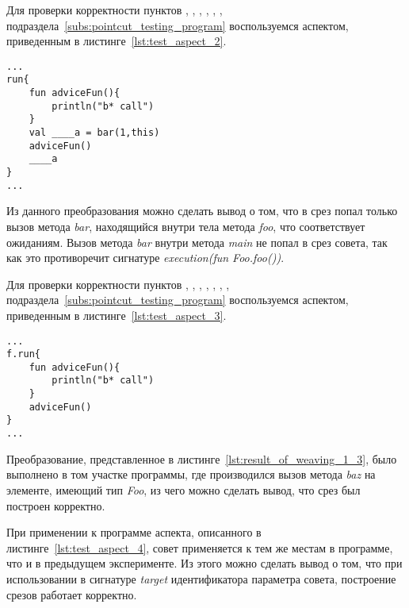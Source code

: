 Для проверки корректности пунктов
 \quotes{\ref{list:method_name_check}},
 \quotes{\ref{list:class_name_check}},
 \quotes{\ref{list:method_modifiers_check}},
 \quotes{\ref{list:method_return_value_check}},
 \quotes{\ref{list:execution_check}},
 \quotes{\ref{list:reference_pointcut_check}},
 \quotes{\ref{list:logic_operations_check}} подраздела~\ref{subs:pointcut_testing_program} воспользуемся аспектом, приведенным в листинге~\ref{lst:test_aspect_2}.
 \begin{lstlisting}[style={java}, label={lst:result_of_weaving_1_2},
 caption={Результат применения аспекта, описанного в листинге~\ref{lst:test_aspect_2}, к тестовой программе}]
...
run{
	fun adviceFun(){
        println("b* call")
    }
	val ____a = bar(1,this)
	adviceFun()
	____a
}
...
\end{lstlisting}
Из данного преобразования можно сделать вывод о том, что в срез попал только вызов метода \textit{bar}, находящийся внутри тела метода \textit{foo}, что соответствует ожиданиям.
Вызов метода \textit{bar} внутри метода \textit{main} не попал в срез совета, так как это противоречит сигнатуре \textit{execution(fun Foo.foo())}.

Для проверки корректности пунктов \quotes{\ref{list:method_name_check}},
\quotes{\ref{list:class_name_check}},
\quotes{\ref{list:method_params_check}},
\quotes{\ref{list:method_modifiers_check}},
\quotes{\ref{list:method_extension_check}},
\quotes{\ref{list:method_return_value_check}},
\quotes{\ref{list:target_check}},
\quotes{\ref{list:logic_operations_check}} подраздела~\ref{subs:pointcut_testing_program} воспользуемся аспектом, приведенным в листинге~\ref{lst:test_aspect_3}.
\begin{lstlisting}[style={java}, label={lst:result_of_weaving_1_3},
 caption={Результат применения аспекта, описанного в листинге~\ref{lst:test_aspect_3}, к тестовой программе}]
...
f.run{
	fun adviceFun(){
        println("b* call")
    }
	adviceFun()
}
...
\end{lstlisting}
Преобразование, представленное в листинге~\ref{lst:result_of_weaving_1_3}, было выполнено в том участке программы, где производился вызов метода \textit{baz} на элементе, имеющий тип \textit{Foo}, из чего можно сделать вывод, что срез был построен корректно.

При применении к программе аспекта, описанного в листинге~\ref{lst:test_aspect_4}, совет применяется к тем же местам в программе, что и в предыдущем эксперименте.
Из этого можно сделать вывод о том, что при использовании в сигнатуре \textit{target} идентификатора параметра совета, построение срезов работает корректно.

